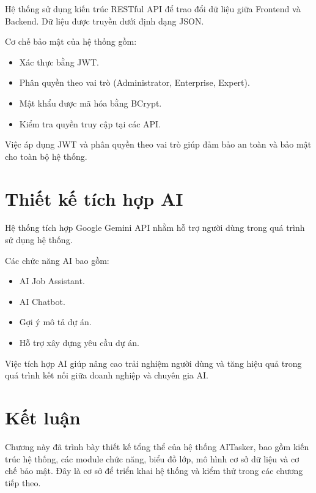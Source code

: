Hệ thống sử dụng kiến trúc RESTful API để trao đổi dữ liệu giữa Frontend và
Backend. Dữ liệu được truyền dưới định dạng JSON.

Cơ chế bảo mật của hệ thống gồm:

\begin{itemize}

\item Xác thực bằng JWT.

\item Phân quyền theo vai trò (Administrator, Enterprise, Expert).

\item Mật khẩu được mã hóa bằng BCrypt.

\item Kiểm tra quyền truy cập tại các API.

\end{itemize}

Việc áp dụng JWT và phân quyền theo vai trò giúp đảm bảo an toàn và bảo mật
cho toàn bộ hệ thống.


\section{Thiết kế tích hợp AI}

Hệ thống tích hợp Google Gemini API nhằm hỗ trợ người dùng trong quá trình sử
dụng hệ thống.

Các chức năng AI bao gồm:

\begin{itemize}

\item AI Job Assistant.

\item AI Chatbot.

\item Gợi ý mô tả dự án.

\item Hỗ trợ xây dựng yêu cầu dự án.

\end{itemize}

Việc tích hợp AI giúp nâng cao trải nghiệm người dùng và tăng hiệu quả trong
quá trình kết nối giữa doanh nghiệp và chuyên gia AI.


\section{Kết luận}

Chương này đã trình bày thiết kế tổng thể của hệ thống AITasker, bao gồm kiến
trúc hệ thống, các module chức năng, biểu đồ lớp, mô hình cơ sở dữ liệu và cơ
chế bảo mật. Đây là cơ sở để triển khai hệ thống và kiểm thử trong các chương
tiếp theo.